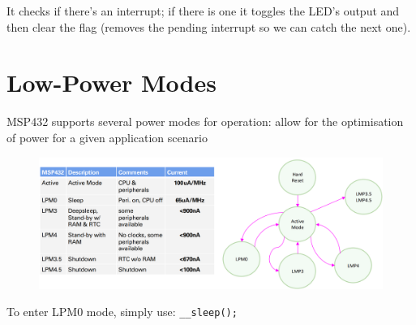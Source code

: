 It checks if there's an interrupt; if there is one it toggles the LED's output and then clear the flag (removes
the pending interrupt so we can catch the next one).

\section{Low-Power Modes}

MSP432 supports several power modes for operation: allow for the optimisation of power for a given application scenario

\begin{figure}[H]
    \centering
    \includegraphics[width=0.9\linewidth]{img/image_63.png}
\end{figure}

To enter LPM0 mode, simply use: \verb|__sleep();|